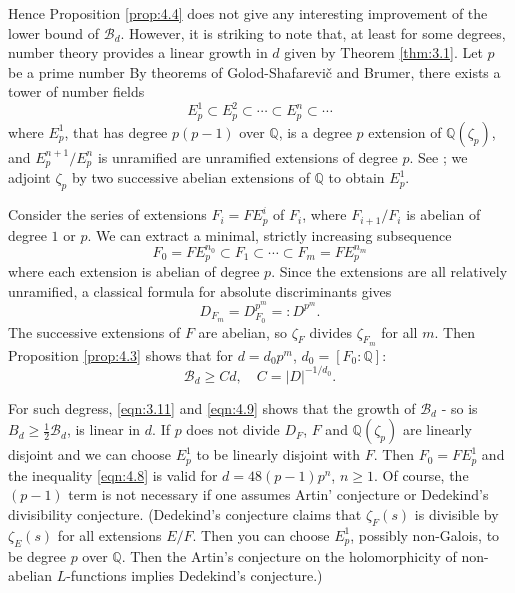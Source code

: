 Hence Proposition \ref{prop:4.4} does not give any interesting improvement of the lower bound of $\mathcal{B}_{d}$.
However, it is striking to note that, at least for some degrees, number theory provides a linear growth in $d$ given by Theorem \ref{thm:3.1}.
Let $p$ be a prime number
By theorems of Golod-Shafarevi\v{c} and Brumer, there exists a tower of number fields
\[
    E_p^1 \subset E_p^2 \subset \cdots \subset E_p^n \subset \cdots
\]
where $E_p^1$, that has degree $p(p-1)$ over $\mathbb{Q}$, is a degree $p$ extension of $\mathbb{Q}(\zeta_p)$, and $E_{p}^{n+1} / E_{p}^{n}$ is unramified are unramified extensions of degree $p$.
See \cite[Cor 7]{towers1967peter}; we adjoint $\zeta_p$ by two successive abelian extensions of $\mathbb{Q}$ to obtain $E_p^1$.

Consider the series of extensions $F_i = F E_p^i$ of $F_i$, where $F_{i+1}/F_{i}$ is abelian of degree $1$ or $p$.
We can extract a minimal, strictly increasing subsequence
\[
    F_0 = F E_{p}^{n_0} \subset F_{1} \subset \cdots \subset F_{m} = F E_{p}^{n_m}
\]
where each extension is abelian of degree $p$.
Since the extensions are all relatively unramified, a classical formula for absolute discriminants gives
\begin{equation}
    \label{eqn:4.8}
    D_{F_m} = D_{F_0}^{p^m} =: D^{p^m}.
\end{equation}
The successive extensions of $F$ are abelian, so $\zeta_F$ divides $\zeta_{F_m}$ for all $m$.
Then Proposition \ref{prop:4.3} shows that for $d = d_0 p^m$, $d_0 = [F_0:\mathbb{Q}]$:
\begin{equation}
    \label{eqn:4.9}
    \mathcal{B}_d \geq C d, \quad C = |D|^{-1/d_0}.
\end{equation}

For such degress, \eqref{eqn:3.11} and \eqref{eqn:4.9} shows that the growth of $\mathcal{B}_d$ - so is $B_d \geq \frac{1}{2}\mathcal{B}_d$, is linear in $d$.
If $p$ does not divide $D_F$, $F$ and $\mathbb{Q}(\zeta_p)$ are linearly disjoint and we can choose $E_p^1$ to be linearly disjoint with $F$.
Then $F_0 = F E_p^1$ and the inequality \eqref{eqn:4.8} is valid for $d = 48(p-1)p^n$, $n \geq 1$.
Of course, the $(p-1)$ term is not necessary if one assumes Artin' conjecture or Dedekind's divisibility conjecture. (Dedekind's conjecture claims that $\zeta_F(s)$ is divisible by $\zeta_E(s)$ for all extensions $E/F$. Then you can choose $E_p^1$, possibly non-Galois, to be degree $p$ over $\mathbb{Q}$.
Then the Artin's conjecture on the holomorphicity of non-abelian $L$-functions implies Dedekind's conjecture.)


